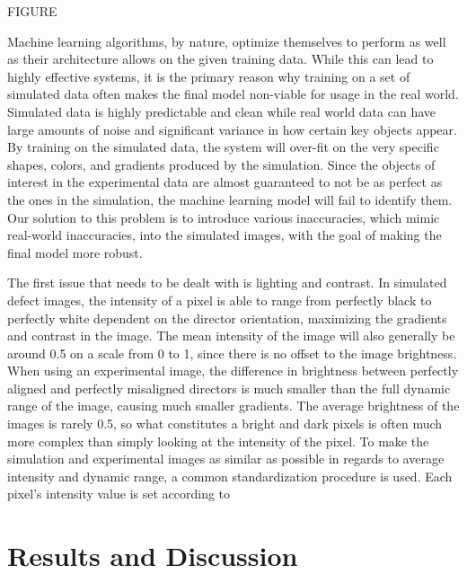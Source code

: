 \documentclass[prl,reprint,showpacs,floatfix,nofootinbib]{revtex4-1}
\begin{document}
FIGURE

Machine learning algorithms, by nature, optimize themselves to perform as well as their architecture allows on the given training data. While this can lead to highly effective systems, it is the primary reason why training on a set of simulated data often makes the final model non-viable for usage in the real world. Simulated data is highly predictable and clean while real world data can have large amounts of noise and significant variance in how certain key objects appear. By training on the simulated data, the system will over-fit on the very specific shapes, colors, and gradients produced by the simulation. Since the objects of interest in the experimental data are almost guaranteed to not be as perfect as the ones in the simulation, the machine learning model will fail to identify them. Our solution to this problem is to introduce various inaccuracies, which mimic real-world inaccuracies, into the simulated images, with the goal of making the final model more robust.

The first issue that needs to be dealt with is lighting and contrast. In simulated defect images, the intensity of a pixel is able to range from perfectly black to perfectly white dependent on the director orientation, maximizing the gradients and contrast in the image. The mean intensity of the image will also generally be around 0.5 on a scale from 0 to 1, since there is no offset to the image brightness. When using an experimental image, the difference in brightness between perfectly aligned and perfectly misaligned directors is much smaller than the full dynamic range of the image, causing much smaller gradients. The average brightness of the images is rarely 0.5, so what constitutes a bright and dark pixels is often much more complex than simply looking at the intensity of the pixel. To make the simulation and experimental images as similar as possible in regards to average intensity and dynamic range, a common standardization procedure is used. Each pixel's intensity value is set according to




\blindtext{}
\section{Results and Discussion}
\blindtext{}




%
%
\end{document}
